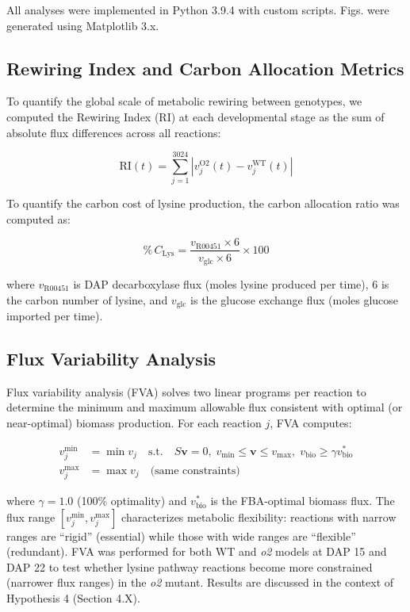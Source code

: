 \documentclass[12pt,a4paper]{article}
\begin{document}
All analyses were implemented in Python 3.9.4 with custom scripts. Figs. were generated using Matplotlib 3.x.

\subsection{Rewiring Index and Carbon Allocation Metrics}

To quantify the global scale of metabolic rewiring between genotypes, we computed the Rewiring Index (RI) at each developmental stage as the sum of absolute flux differences across all reactions:

\begin{equation}
    \mathrm{RI}(t) = \sum_{j=1}^{3024} |v_j^{\mathrm{O2}}(t) - v_j^{\mathrm{WT}}(t)|
\end{equation}

To quantify the carbon cost of lysine production, the carbon allocation ratio was computed as:

\begin{equation}
    \%\,C_{\mathrm{Lys}} = \frac{v_{\mathrm{R00451}} \times 6}{v_{\mathrm{glc}} \times 6} \times 100
\end{equation}

where $v_{\mathrm{R00451}}$ is DAP decarboxylase flux (moles lysine produced per time), 6 is the carbon number of lysine, and $v_{\mathrm{glc}}$ is the glucose exchange flux (moles glucose imported per time).

\subsection{Flux Variability Analysis}

Flux variability analysis (FVA) \citep{Mahadevan2003} solves two linear programs per reaction to determine the minimum and maximum allowable flux consistent with optimal (or near-optimal) biomass production. For each reaction $j$, FVA computes:

\begin{align}
    v_j^{\min} &= \min v_j \quad \text{s.t.} \quad S\mathbf{v} = 0,\; v_{\min} \leq \mathbf{v} \leq v_{\max},\; v_{\mathrm{bio}} \geq \gamma v_{\mathrm{bio}}^* \\
    v_j^{\max} &= \max v_j \quad \text{(same constraints)}
\end{align}

where $\gamma = 1.0$ (100\% optimality) and $v_{\mathrm{bio}}^*$ is the FBA-optimal biomass flux. The flux range $[v_j^{\min}, v_j^{\max}]$ characterizes metabolic flexibility: reactions with narrow ranges are ``rigid'' (essential) while those with wide ranges are ``flexible'' (redundant). FVA was performed for both WT and \textit{o2} models at DAP 15 and DAP 22 to test whether lysine pathway reactions become more constrained (narrower flux ranges) in the \textit{o2} mutant. Results are discussed in the context of Hypothesis 4 (Section 4.X).
\end{document}
